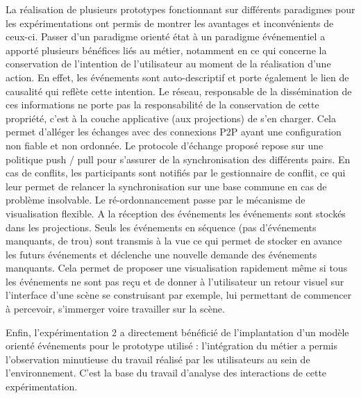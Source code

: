 La réalisation de plusieurs prototypes fonctionnant sur différents 
paradigmes pour les expérimentations ont permis de montrer les avantages et 
inconvénients de ceux-ci.
Passer d'un paradigme orienté état à un paradigme événementiel a apporté
plusieurs bénéfices liés au métier, notamment en ce qui concerne la conservation 
de l'intention de l'utilisateur au moment de la réalisation d'une action. En effet, les 
événements sont auto-descriptif et porte également le lien de causalité qui reflète 
cette intention. Le réseau, responsable de la dissémination de ces informations ne 
porte pas la responsabilité de la conservation de cette propriété, c'est à la couche 
applicative (aux projections) de s'en charger. Cela permet d'alléger les échanges 
avec des connexions \gls{P2P} ayant une configuration non fiable et non 
ordonnée. Le protocole d'échange proposé repose sur une politique push / pull pour 
s'assurer de la synchronisation des différents pairs. En cas de conflits, les 
participants sont notifiés par le gestionnaire de conflit, ce qui leur permet de 
relancer la synchronisation sur une base commune en cas de problème insolvable. 
Le ré-ordonnancement passe par le mécanisme de visualisation flexible. A la 
réception des événements les événements sont stockés dans les projections. 
Seuls les événements en séquence (pas d'événements manquants, de \og 
trou\fg{}) sont transmis à la vue ce qui permet de stocker en avance les futurs 
événements et déclenche une nouvelle demande des événements manquants. 
Cela permet de proposer une visualisation rapidement même si tous les 
événements ne sont pas reçu et de donner à l'utilisateur un retour visuel sur 
l'interface d'une scène se construisant par exemple, lui permettant de commencer 
à percevoir, s'immerger voire travailler sur la scène.

Enfin, l'expérimentation 2 a directement bénéficié de l'implantation d'un modèle 
orienté événements pour le prototype utilisé : l'intégration du métier a permis 
l'observation minutieuse du travail réalisé par les utilisateurs au sein de 
l'environnement. C'est la base du travail d'analyse des interactions de cette 
expérimentation.

